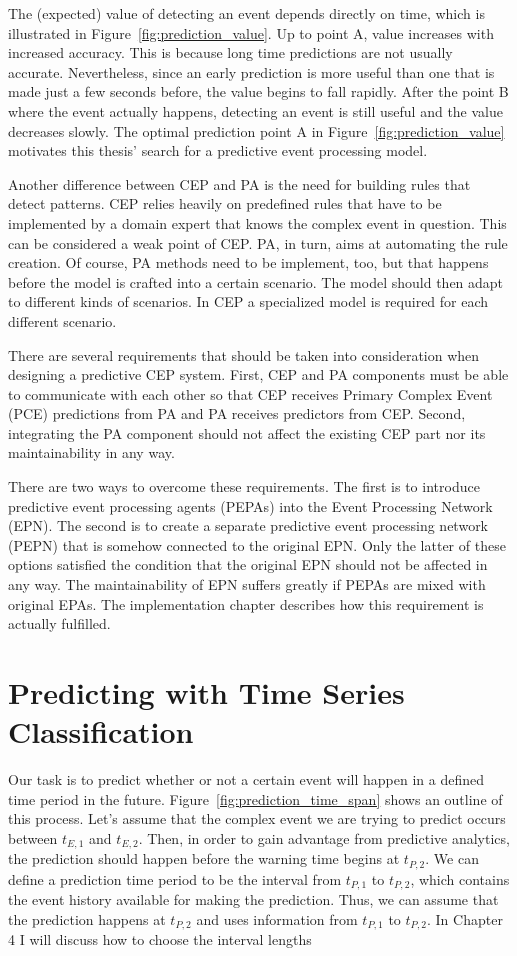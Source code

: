 The (expected) value of detecting an event depends directly on time, which is illustrated in Figure~\ref{fig:prediction_value}. Up to point A, value increases with increased accuracy. This is because long time predictions are not usually accurate. Nevertheless, since an early prediction is more useful than one that is made just a few seconds before, the value begins to fall rapidly. After the point B where the event actually happens, detecting an event is still useful and the value decreases slowly. The optimal prediction point A in Figure~\ref{fig:prediction_value} motivates this thesis' search for a predictive event processing model.

Another difference between CEP and PA is the need for building rules that detect patterns. CEP relies heavily on predefined rules that have to be implemented by a domain expert that knows the complex event in question. This can be considered a weak point of CEP. PA, in turn, aims at automating the rule creation. Of course, PA methods need to be implement, too, but that happens before the model is crafted into a certain scenario. The model should then adapt to different kinds of scenarios. In CEP a specialized model is required for each different scenario.

There are several requirements that should be taken into consideration when designing a predictive CEP system. First, CEP and PA components must be able to communicate with each other so that CEP receives Primary Complex Event (PCE) predictions from PA and PA receives predictors from CEP. Second, integrating the PA component should not affect the existing CEP part nor its maintainability in any way. \cite{Fulop12}

There are two ways to overcome these requirements. The first is to introduce predictive event processing agents (PEPAs) into the Event Processing Network (EPN). The second is to create a separate predictive event processing network (PEPN) that is somehow connected to the original EPN. Only the latter of these options satisfied the condition that the original EPN should not be affected in any way. The maintainability of EPN suffers greatly if PEPAs are mixed with original EPAs. \cite{Fulop12} The implementation chapter describes how this requirement is actually fulfilled. 


\section{Predicting with Time Series Classification}
Our task is to predict whether or not a certain event will happen in a defined time period in the future. Figure~\ref{fig:prediction_time_span} shows an outline of this process. Let's assume that the complex event we are trying to predict occurs between $t_{E,1}$ and $t_{E,2}$. Then, in order to gain advantage from predictive analytics, the prediction should happen before the warning time begins at $t_{P,2}$. We can define a prediction time period to be the interval from $t_{P,1}$ to $t_{P,2}$, which contains the event history available for making the prediction. Thus, we can assume that the prediction happens at $t_{P,2}$ and uses information from $t_{P,1}$ to $t_{P,2}$. In Chapter 4 I will discuss how to choose the interval lengths 

